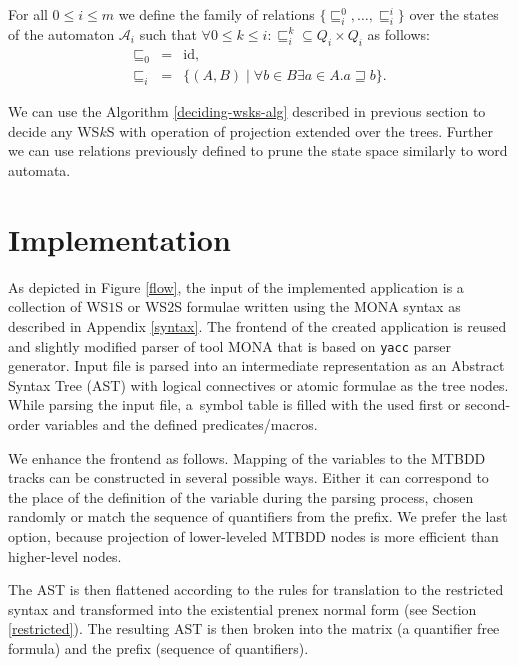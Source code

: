 \begin{defz}
For all $0 \leq i \leq m$ we define the family of relations
$\{\sqsubseteq_i^0,\ldots,\sqsubseteq^i_i\}$ over the states of the automaton
$\mathcal{A}_i$ such that $\forall 0 \leq k \leq i: \sqsubseteq_i^k\subseteq Q_i
\times Q_i$ as follows:
\begin{eqnarray}
 \sqsubseteq_0 & = & \text{id},\\
 \sqsubseteq_i & = & \{(A, B) \mid \forall b \in B \exists a \in A. a
 \sqsupseteq b\}.
\end{eqnarray}
\end{defz}

We can use the Algorithm \ref{deciding-wsks-alg} described in previous section
to decide any WS$k$S with operation of projection extended over the trees.
Further we can use relations previously defined to prune the state space
similarly to word automata.

\chapter{Implementation}\label{impl}

As depicted in Figure \ref{flow}, the input of the implemented application is
a collection of WS$1$S or WS$2$S formulae written using the \textsc{MONA}
syntax as described in Appendix \ref{syntax}. The frontend of the
created application is reused and slightly modified parser of tool \textsc{MONA}
that is based on \texttt{yacc} \cite{yacc} parser generator. Input file is
parsed into an intermediate representation as an Abstract Syntax
Tree (AST) with logical connectives or atomic formulae as the
tree nodes. While parsing the input file, a~symbol table is filled with the used
first or second-order variables and the defined predicates/macros. 

We enhance the frontend as follows. Mapping of the variables to the MTBDD tracks
can be constructed in several possible ways.
Either it can correspond to the place of the definition of the variable during
the parsing process, chosen randomly or match the sequence of quantifiers from
the prefix. We prefer the last option, because projection of lower-leveled MTBDD
nodes is more efficient than higher-level nodes.

The AST is then flattened according to the rules for translation to
the restricted syntax and transformed into
the existential prenex normal form (see Section \ref{restricted}). The resulting
AST is then broken into the matrix (a quantifier free formula) and the
prefix (sequence of quantifiers).

